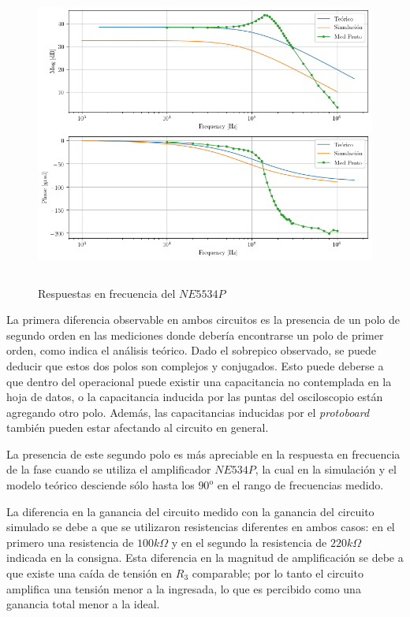 \begin{figure}
\begin{center}
\includegraphics[height=10cm]{../Ex2/Informe/rsc/ne_bode_proto.png}
\caption{Respuestas en frecuencia del $NE5534P$}
\label{fig:e2_ne_bode}
\end{center}
\end{figure}

La primera diferencia observable en ambos circuitos es la presencia de un polo de segundo orden en las mediciones donde debería encontrarse un polo de primer orden, como indica el análisis teórico. Dado el sobrepico observado, se puede deducir que estos dos polos son complejos y conjugados.
Esto puede deberse a que dentro del operacional puede existir una capacitancia no contemplada en la hoja de datos, o la capacitancia inducida por las puntas del osciloscopio están agregando otro polo. Además, las capacitancias inducidas por el \textit{protoboard} también pueden estar afectando al circuito en general.

La presencia de este segundo polo es más apreciable en la respuesta en frecuencia de la fase cuando se utiliza el amplificador $NE534P$, la cual en la simulación y el modelo teórico desciende sólo hasta los $90^{\text{o}}$ en el rango de frecuencias medido.

La diferencia en la ganancia del circuito medido con la ganancia del circuito simulado se debe a que se utilizaron resistencias diferentes en ambos casos: en el primero una resistencia de $100k\Omega$ y en el segundo la resistencia de $220k\Omega$ indicada en la consigna. Esta diferencia en la magnitud de amplificación se debe a que existe una caída de tensión en $R_3$ comparable; por lo tanto el circuito amplifica una tensión menor a la ingresada, lo que es percibido como una ganancia total menor a la ideal.

